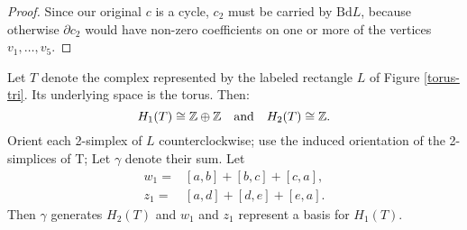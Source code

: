 \begin{proof}
Since our original $c$ is a cycle, $c_2$ must be carried by $\mathrm{Bd} L$, because otherwise $\partial c_2$ 
would have non-zero coefficients on one or more of the vertices $v_1, \dots,v_5$.
\end{proof}

\begin{theorem}
	Let $T$ denote the complex represented by the labeled rectangle $L$ of Figure \ref{torus-tri}. Its underlying space is the torus. Then:
	\[H_1(T)\cong \mathbb{Z}\oplus\mathbb{Z} \quad \text{and} \quad H_2(T)\cong \mathbb{Z}.\]
	Orient each 2-simplex of $L$ counterclockwise; use the induced orientation of the 2-simplices of T; Let $\gamma$ denote their sum. Let 
	\begin{align*}
	w_1=&[a,b]+[b,c]+[c,a],\\
	z_1=&[a,d]+[d,e]+[e,a].
	\end{align*}
	Then $\gamma$ generates $H_2(T)$ and $w_1$ and $z_1$ represent a basis for $H_1(T)$.
\end{theorem}


